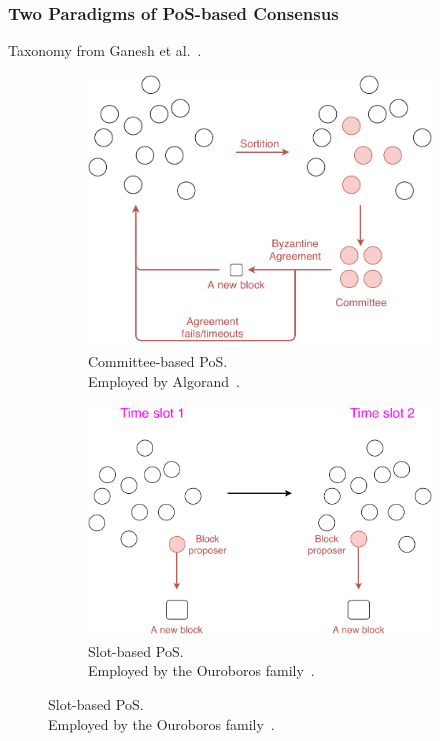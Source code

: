 \documentclass{beamer}
\begin{document}
\begin{frame}
\frametitle{Two Paradigms of PoS-based Consensus}

Taxonomy from Ganesh et al.~\cite{ganesh2019proof}.

\begin{figure}
    \begin{subfigure}{.45\textwidth}
        \centering
        \includegraphics[width=.8\linewidth]{./figs/committee-based-pos.pdf}  
        \caption{Committee-based PoS.\\Employed by Algorand~\cite{gilad2017algorand}.}
    \end{subfigure}
    \hfill
    \begin{subfigure}{.45\textwidth}
      \centering
      \includegraphics[width=.8\linewidth]{./figs/slot-based-pos.pdf}  
      \caption{Slot-based PoS.\\Employed by the Ouroboros family~\cite{kiayias2017ouroboros, david2018ouroboros, badertscher2018ouroboros, kerber2019ouroboros}.}
    \end{subfigure}
\end{figure}

\end{frame}
\end{document}
